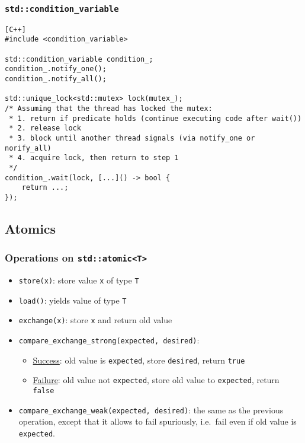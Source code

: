 \documentclass[twocolumn,landscape,10pt]{article}
\theoremstyle{definition}
\begin{document}
\subsubsection{\texttt{std::condition\_variable}}

\begin{lstlisting}[C++]
#include <condition_variable>

std::condition_variable condition_;
condition_.notify_one();
condition_.notify_all();

std::unique_lock<std::mutex> lock(mutex_);
/* Assuming that the thread has locked the mutex:
 * 1. return if predicate holds (continue executing code after wait())
 * 2. release lock
 * 3. block until another thread signals (via notify_one or norify_all)
 * 4. acquire lock, then return to step 1
 */
condition_.wait(lock, [...]() -> bool {
    return ...;
});
\end{lstlisting}

\subsection{Atomics}

\subsubsection{Operations on \texttt{std::atomic<T>}}

\begin{itemize}
    \item \texttt{store(x)}: store value \texttt{x} of type \texttt{T}
    \item \texttt{load()}: yields value of type \texttt{T}
    \item \texttt{exchange(x)}: store \texttt{x} and return old value
    \item \texttt{compare\_exchange\_strong(expected, desired)}:
        \begin{itemize}
            \item \underline{Success}: old value is \texttt{expected}, store
                \texttt{desired}, return \texttt{true}
            \item \underline{Failure}: old value not \texttt{expected}, store
                old value to \texttt{expected}, return \texttt{false}
        \end{itemize} 
    \item \texttt{compare\_exchange\_weak(expected, desired)}:
        the same as the previous operation,
        except that it allows to fail spuriously, i.e.\ fail even if old value
        is \texttt{expected}.
\end{itemize} 
\end{document}
